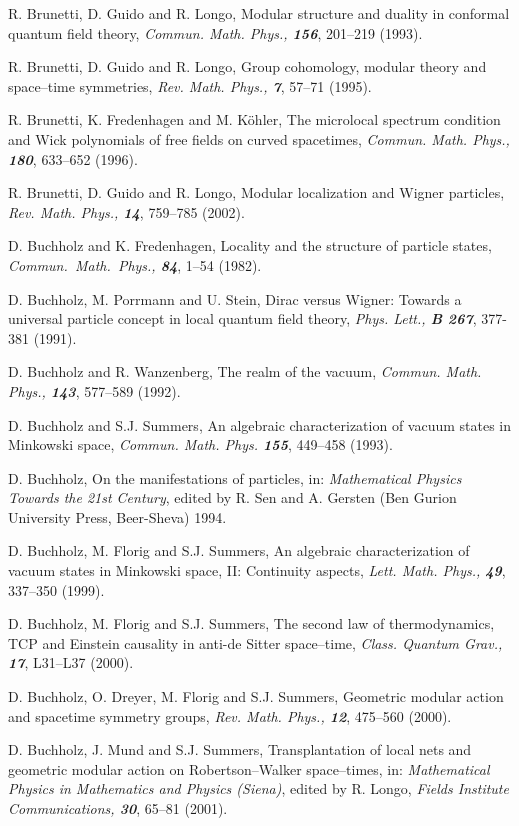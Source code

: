 \documentclass[12pt]{article}
\begin{document}
\begin{thebibliography}{Bor}
R. Brunetti, D. Guido and R. Longo, Modular structure and duality in
conformal quantum field theory, {\sl Commun. Math. Phys., \bf 156}, 201--219
(1993).

R. Brunetti, D. Guido and R. Longo, Group cohomology, modular theory
and space--time symmetries, {\sl Rev. Math. Phys., \bf 7}, 57--71 (1995).

R. Brunetti, K. Fredenhagen and M. K\"ohler, The microlocal spectrum 
condition and Wick polynomials of free fields on curved spacetimes, {\sl
Commun. Math. Phys., \bf 180}, 633--652 (1996).

R. Brunetti, D. Guido and R. Longo, Modular localization and Wigner
particles, {\sl Rev. Math. Phys., \bf 14}, 759--785 (2002).

D. Buchholz and K. Fredenhagen, Locality and the structure of particle
states, {\sl  Commun.\ Math.\ Phys.,  \bf 84}, 1--54 (1982). 

D. Buchholz, M. Porrmann and U. Stein, Dirac versus Wigner: Towards a 
universal particle concept in local quantum field theory, {\sl Phys. Lett.,
\bf B 267}, 377-381 (1991).

D. Buchholz and R. Wanzenberg, The realm of the vacuum, {\sl Commun. 
Math. Phys., \bf 143}, 577--589 (1992).

D. Buchholz and S.J. Summers, An algebraic characterization of 
vacuum states in Minkowski space, {\sl Commun. Math. Phys. \bf 155}, 449--458 
(1993).

D. Buchholz, On the manifestations of particles, in: {\it Mathematical 
Physics Towards the 21st Century}, edited by R. Sen and A. Gersten 
(Ben Gurion University Press, Beer-Sheva) 1994.

D. Buchholz, M. Florig and S.J. Summers, An algebraic 
characterization of vacuum states in Minkowski space, II: Continuity aspects, 
{\sl Lett. Math. Phys., \bf 49}, 337--350 (1999).

D. Buchholz, M. Florig and S.J. Summers, The second law of
thermodynamics, TCP and Einstein causality in anti-de Sitter space--time,
{\sl Class. Quantum Grav., \bf 17}, L31--L37 (2000). 

D. Buchholz, O. Dreyer, M. Florig and S.J. Summers, Geometric 
modular action and spacetime symmetry groups, {\sl Rev. Math. Phys., \bf 12}, 
475--560 (2000).

D. Buchholz, J. Mund and S.J. Summers, Transplantation of local nets
and geometric modular action on Robertson--Walker space--times, in:
{\it Mathematical Physics in Mathematics and Physics (Siena)},
edited by R. Longo, {\sl Fields Institute Communications, \bf 30}, 65--81
(2001).


\end{thebibliography}
\end{document}
